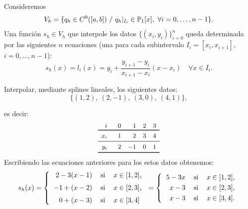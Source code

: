     Consideremos
    \begin{equation*}
      V_h = \{q_h \in C^{0}([a,b])\ / \ q_h|_{I_i}\in  \operatorname{{\mathbb P}}_1[x],\ \forall i=0,\dots,n-1\}.
    \end{equation*}
    Una función $s_h\in V_h$ que interpole los datos
    $\{(x_i,y_i)\}_{i=0}^n$ queda determinada por las siguientes $n$
    ecuaciones (una para cada subintervalo $I_i=[x_i, x_{i+1}]$,
    $i=0,\dots,n-1$):
    \begin{equation*}
      \label{eq:splines-lineales-1}
      s_h(x) = l_i(x) = y_i + \frac{y_{i+1}-y_i}{x_{i+1}-x_i}(x-x_i) \quad
      \forall x\in I_i.
    \end{equation*}

    \begin{example}
      \label{ex:splines-lineales-1}
      Interpolar, mediante splines lineales, los siguientes
      datos:
      \begin{equation*}
        \{ (1,2),\ (2,-1),\ (3,0),\ (4,1) \},
      \end{equation*}
    \end{example}
    es decir:
    \begin{equation}
      \small
      \begin{array}{r@{\rule{4ex}{0pt}}rrrcr}
        i & 0 & 1 & 2 & 3 
        \\ \toprule %
        x_i & 1 & 2 & 3 & 4
        \\ \midrule
        y_i & 2 & -1 & 0  & 1
        \\
        \bottomrule
      \end{array}
      \label{eq:tabla-datos-lagrange-splines}
    \end{equation}
    Escribiendo las ecuaciones anteriores para los
    estos datos obtenemos:
    \begin{equation*}
      s_h(x)=\left\{
        \begin{tabular}{rll}
          $2 -3 (x-1)$ & si & $x\in[1,2]$,
          \\\noalign{\medskip}
          $-1 + (x-2)$ & si & $x\in[2,3]$,
          \\\noalign{\medskip}
          $0 + (x-3)$ & si & $x\in[3,4]$
        \end{tabular} \right.
      =\left\{
        \begin{tabular}{rll}
          $5 -3x$ & si & $x\in[1,2]$,
          \\\noalign{\smallskip}
          $x-3$ & si & $x\in[2,3]$,
          \\\noalign{\smallskip}
          $x-3$ & si & $x\in[3,4]$.
        \end{tabular} \right.
    \end{equation*}

